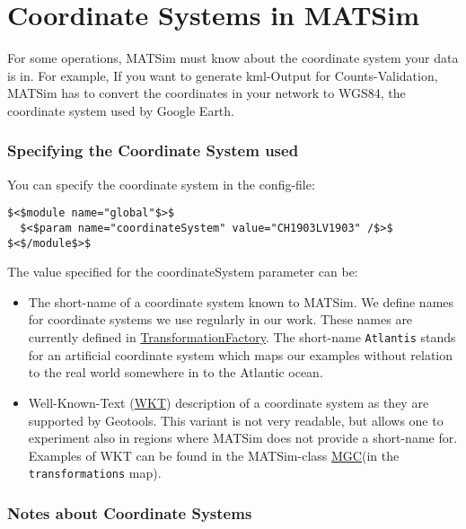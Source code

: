 \documentclass[a4paper,11pt]{report}
\begin{document}
\vfill\eject
\section{Coordinate Systems in MATSim}

For  some operations, MATSim must know about the coordinate system your data  is in. For example, If you want to generate kml-Output for  Counts-Validation, MATSim has to convert the coordinates in your network  to WGS84, the coordinate system used by Google Earth.


\subsubsection{Specifying the Coordinate System used}

You can specify the coordinate system in the config-file:
\begin{verbatim}
$<$module name="global"$>$
  $<$param name="coordinateSystem" value="CH1903LV1903" /$>$
$<$/module$>$
\end{verbatim}

The value specified for the coordinateSystem parameter can be:
\begin{itemize}
	\item The short-name of a coordinate system known to MATSim. We define  names for coordinate systems we use regularly in our work. These names  are currently defined in \href{http://matsim.svn.sourceforge.net/viewvc/matsim/matsim/trunk/src/main/java/org/matsim/core/utils/geometry/transformations/TransformationFactory.java?view=markup}{TransformationFactory}. The short-name 
\texttt{Atlantis}  stands for an artificial coordinate system which maps our examples  without relation to the real world somewhere in to the Atlantic ocean.
	\item Well-Known-Text (\href{http://www.geoapi.org/snapshot/javadoc/org/opengis/referencing/doc-files/WKT.html}{WKT})  description of a coordinate system as they are supported by Geotools.  This variant is not very readable, but allows one to experiment also in  regions where MATSim does not provide a short-name for. Examples of WKT  can be found in the MATSim-class \href{http://matsim.svn.sourceforge.net/viewvc/matsim/matsim/trunk/src/main/java/org/matsim/core/utils/geometry/geotools/MGC.java?view=markup}{MGC}(in the 
\texttt{transformations} map).
\end{itemize}

\subsubsection{Notes about Coordinate Systems}
\end{document}
